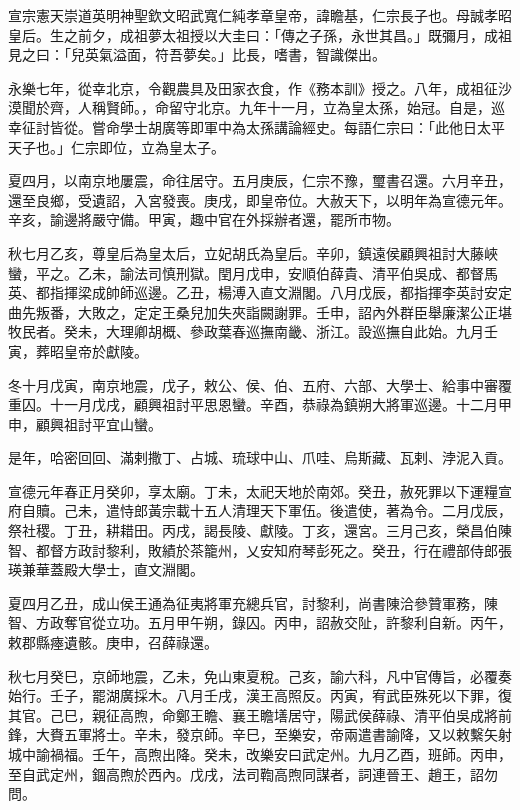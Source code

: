 
\begin{pinyinscope}
宣宗憲天崇道英明神聖欽文昭武寬仁純孝章皇帝，諱瞻基，仁宗長子也。母誠孝昭皇后。生之前夕，成祖夢太祖授以大圭曰：「傳之子孫，永世其昌。」既彌月，成祖見之曰：「兒英氣溢面，符吾夢矣。」比長，嗜書，智識傑出。

永樂七年，從幸北京，令觀農具及田家衣食，作《務本訓》授之。八年，成祖征沙漠聞於齊，人稱賢師。，命留守北京。九年十一月，立為皇太孫，始冠。自是，巡幸征討皆從。嘗命學士胡廣等即軍中為太孫講論經史。每語仁宗曰：「此他日太平天子也。」仁宗即位，立為皇太子。

夏四月，以南京地屢震，命往居守。五月庚辰，仁宗不豫，璽書召還。六月辛丑，還至良鄉，受遺詔，入宮發喪。庚戌，即皇帝位。大赦天下，以明年為宣德元年。辛亥，諭邊將嚴守備。甲寅，趣中官在外採辦者還，罷所市物。

秋七月乙亥，尊皇后為皇太后，立妃胡氏為皇后。辛卯，鎮遠侯顧興祖討大藤峽蠻，平之。乙未，諭法司慎刑獄。閏月戊申，安順伯薛貴、清平伯吳成、都督馬英、都指揮梁成帥師巡邊。乙丑，楊溥入直文淵閣。八月戊辰，都指揮李英討安定曲先叛番，大敗之，定定王桑兒加失夾詣闕謝罪。壬申，詔內外群臣舉廉潔公正堪牧民者。癸未，大理卿胡概、參政葉春巡撫南畿、浙江。設巡撫自此始。九月壬寅，葬昭皇帝於獻陵。

冬十月戊寅，南京地震，戊子，敕公、侯、伯、五府、六部、大學士、給事中審覆重囚。十一月戊戌，顧興祖討平思恩蠻。辛酉，恭祿為鎮朔大將軍巡邊。十二月甲申，顧興祖討平宜山蠻。

是年，哈密回回、滿剌撒丁、占城、琉球中山、爪哇、烏斯藏、瓦剌、浡泥入貢。

宣德元年春正月癸卯，享太廟。丁未，太祀天地於南郊。癸丑，赦死罪以下運糧宣府自贖。己未，遣恃郎黃宗載十五人清理天下軍伍。後遣使，著為令。二月戊辰，祭社稷。丁丑，耕耤田。丙戌，謁長陵、獻陵。丁亥，還宮。三月己亥，榮昌伯陳智、都督方政討黎利，敗績於茶籠州，乂安知府琴彭死之。癸丑，行在禮部侍郎張瑛兼華蓋殿大學士，直文淵閣。

夏四月乙丑，成山侯王通為征夷將軍充總兵官，討黎利，尚書陳洽參贊軍務，陳智、方政奪官從立功。五月甲午朔，錄囚。丙申，詔赦交阯，許黎利自新。丙午，敕郡縣瘞遺骸。庚申，召薛祿還。

秋七月癸巳，京師地震，乙未，免山東夏稅。己亥，諭六科，凡中官傳旨，必覆奏始行。壬子，罷湖廣採木。八月壬戌，漢王高照反。丙寅，宥武臣殊死以下罪，復其官。己巳，親征高煦，命鄭王瞻、襄王瞻墡居守，陽武侯薛祿、清平伯吳成將前鋒，大賚五軍將士。辛未，發京師。辛巳，至樂安，帝兩遣書諭降，又以敕繫矢射城中諭禍福。壬午，高煦出降。癸未，改樂安曰武定州。九月乙酉，班師。丙申，至自武定州，錮高煦於西內。戊戌，法司鞫高煦同謀者，詞連晉王、趙王，詔勿問。


\end{pinyinscope}
